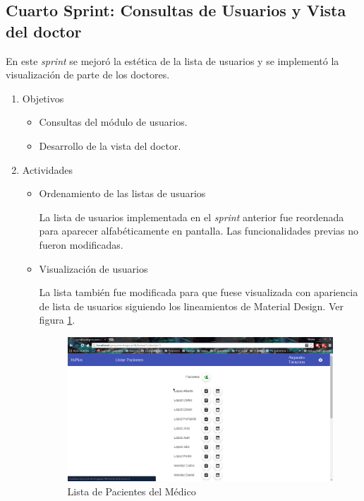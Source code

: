         
    \subsection{Cuarto Sprint: Consultas de Usuarios y Vista del doctor}
    
    En este \textit{sprint} se mejoró la estética de la lista de usuarios y se implementó la visualización de parte de los doctores.
    
    \begin{enumerate}
        \item Objetivos
        \begin{itemize}
            \item Consultas del módulo de usuarios.
            \item Desarrollo de la vista del doctor.
        \end{itemize}
        \item Actividades
        \begin{itemize}
            \item Ordenamiento de las listas de usuarios
            
            La lista de usuarios implementada en el \textit{sprint} anterior fue reordenada para aparecer alfabéticamente en pantalla. Las funcionalidades previas no fueron modificadas.
            
            \item Visualización de usuarios
            
            La lista también fue modificada para que fuese visualizada con apariencia de lista de usuarios siguiendo los lineamientos de Material Design. Ver figura \ref{Pacientes}.
            
            \begin{figure}[htbp!]
                \begin{center}
                    \includegraphics[width=.8\textwidth]{figures/p6}
                \end{center}
                \caption{\label{Pacientes}Lista de Pacientes del Médico}
            \end{figure}
            

\end{itemize}
\end{enumerate}
